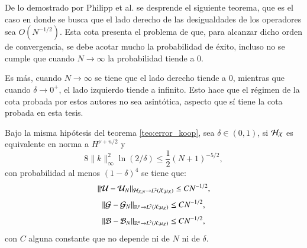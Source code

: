 De lo demostrado por Philipp et al. se desprende el siguiente teorema, que es el caso en donde se busca que el lado derecho de las desigualdades de los operadores sea $O(N^{-1/2})$. Esta cota presenta el problema de que, para alcanzar dicho orden de convergencia, se debe acotar mucho la probabilidad de éxito, incluso no se cumple que cuando $N \to \infty$ la probabilidad tiende a $0$. 

Es más, cuando $N \to \infty$ se tiene que el lado derecho tiende a $0$, mientras que cuando $\delta \to 0^+$, el lado izquierdo tiende a infinito. Esto hace que el régimen de la cota probada por estos autores no sea asintótica, aspecto que sí tiene la cota probada en esta tesis.

\begin{teo}
    Bajo la misma hipótesis del teorema \ref{teo:error_koop}, sea $\delta \in (0, 1)$, si $\mathcal{H}_{\mathcal{X}}$ es equivalente en norma a $H^{\nu + n/2}$ y
    \[
    8\|k\|^2_\infty \ln(2/\delta) \leq \frac{1}{2} (N+1)^{-5/2},
    \]
    con probabilidad al menos $(1 - \delta)^4$ se tiene que:
    \begin{equation*}
        \| \mathcal{U} - \mathcal{U}_N \|_{\mathcal{H}_{\mathcal{X}, N} \to L^2(\mathcal{X}; \mu_{\mathcal{X}})} \leq C N^{-1/2},
    \end{equation*}
    \begin{equation*}
    \| \mathcal{G} - \mathcal{G}_N \|_{\mathbb{R}^p \to L^2(\mathcal{X}; \mu_{\mathcal{X}})} \leq C N^{-1/2},
    \end{equation*}
    \begin{equation*}
    \| \mathcal{B} - \mathcal{B}_N \|_{\mathbb{R}^n \to L^2(\mathcal{X}; \mu_{\mathcal{X}})} \leq C N^{-1/2},
    \end{equation*}
    con $C$ alguna constante que no depende ni de $N$ ni de $\delta$.
    \label{teo:error_koop_sqrt_N_hip}
\end{teo}

